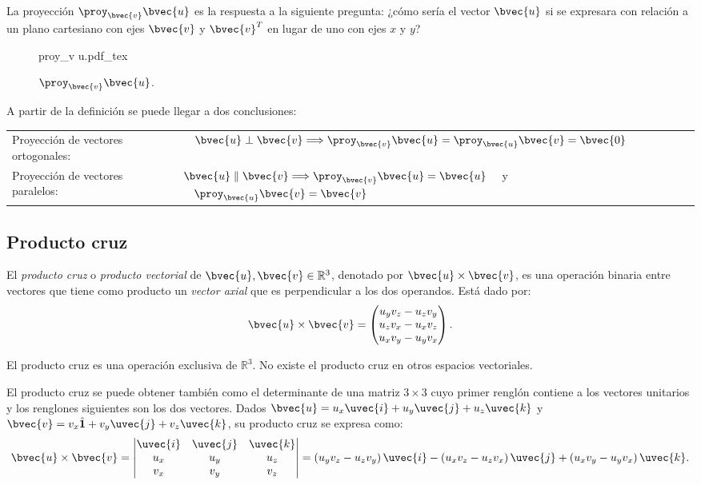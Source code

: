 \documentclass{fmbnotes}
\begin{document}
La proyección \( \proy_{\bvec{v}} \bvec{u} \) es la respuesta a la siguiente pregunta: ¿cómo sería el vector \( \bvec{u} \) si se expresara con relación a un plano cartesiano con ejes \( \bvec{v} \) y \( \bvec{v}^{T} \) en lugar de uno con ejes \( x \) y \( y \)? 

\begin{figure}[H]
\centering
{proy_v u.pdf_tex}
\caption{\( \proy_{\bvec{v}} \bvec{u} \).}
\label{fig:proy_v-u}
\end{figure}

A partir de la definición se puede llegar a dos conclusiones:


\begin{tabular}{lp{}}
	\rule[1ex]{0pt}{2.5ex} Proyección de vectores ortogonales: &  \( \quad \bvec{u} \perp \bvec{v} \Longrightarrow \proy_{\bvec{v}} \bvec{u}=\proy_{\bvec{u}} \bvec{v}=\bvec{0}\) \\
	\rule[1ex]{0pt}{2.5ex} Proyección de vectores paralelos: & \( \bvec{u} \parallel \bvec{v} \Longrightarrow \proy_{\bvec{v}} \bvec{u}=\bvec{u} \quad\) y \(\quad \proy_{\bvec{u}} \bvec{v}=\bvec{v} \) \\
\end{tabular}


\subsection{ Producto cruz}
El \emph{producto cruz} o \emph{producto vectorial} de \( \bvec{u}, \bvec{v} \in \mathbb{R}^{3} \), denotado por \( \bvec{u} \times \bvec{v} \), es una operación binaria entre vectores que tiene como producto un \emph{vector axial} que es perpendicular a los dos operandos. Está dado por:
 \[ \bvec{u} \times \bvec{v}= \begin{pmatrix}
 	u_yv_z-u_zv_y \\
 	u_zv_x - u_xv_z \\
 	u_xv_y - u_yv_x
 \end{pmatrix}.\]
\begin{advertencia}
	El producto cruz es una operación exclusiva de \( \mathbb{R}^{3} \). No existe el producto cruz en otros espacios vectoriales.
\end{advertencia} 
 
El producto cruz se puede obtener también como el determinante de una matriz \( 3 \times 3 \) cuyo primer renglón contiene a los vectores unitarios y los renglones siguientes son los dos vectores. Dados \( \bvec{u}=u_{x} \uvec{i}+u_{y} \uvec{j}+u_{z} \uvec{k} \) y \( \bvec{v}=v_{x} \hat{\mathbf{1}}+v_{y} \uvec{j}+v_{z} \uvec{k} \), su producto cruz se expresa como:
 \[ \bvec{u} \times \bvec{v}=\begin{vmatrix}
 \uvec{i} & \uvec{j} & \uvec{k} \\
 u_{x} & u_{y} & u_{z} \\
 v_{x} & v_{y} & v_{z}
 \end{vmatrix} = \left(u_{y} v_{z}-u_{z} v_{y}\right) \uvec{i}-\left(u_{x} v_{z}-u_{z} v_{x}\right) \uvec{j}+\left(u_{x} v_{y}-u_{y} v_{x}\right) \uvec{k}.\]
\end{document}
